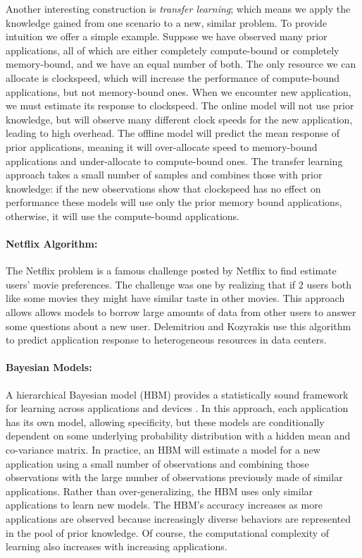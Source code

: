 Another interesting construction is \textit{transfer learning}; which
means we apply the knowledge gained from one scenario to a new,
similar problem.  To provide intuition we offer a simple example.
Suppose we have observed many prior applications, all of which are
either completely compute-bound or completely memory-bound, and we
have an equal number of both.  The only resource we can allocate is
clockspeed, which will increase the performance of compute-bound
applications, but not memory-bound ones.  When we encounter new
application, we must estimate its response to clockspeed.  The online
model will not use prior knowledge, but will observe many different
clock speeds for the new application, leading to high overhead.  The
offline model will predict the mean response of prior applications,
meaning it will over-allocate speed to memory-bound applications and
under-allocate to compute-bound ones.  The transfer learning approach
takes a small number of samples and combines those with prior
knowledge: if the new observations show that clockspeed has no effect
on performance these models will use only the prior memory bound
applications, otherwise, it will use the compute-bound applications.

\paragraph{Netflix Algorithm:}
The Netflix problem is a famous challenge posted by Netflix to find
estimate users' movie preferences. The challenge was one by realizing
that if 2 users both like some movies they might have similar taste in
other movies. This approach allows allows models to borrow large
amounts of data from other users to answer some questions about a new
user.  
Delemitriou and Kozyrakis use this algorithm to predict application
response to heterogeneous resources in data centers\cite{Paragon}.


\paragraph{ Bayesian Models:} A hierarchical Bayesian model (HBM)
provides a statistically sound framework for learning across
applications and devices \cite{LEO}.  In this approach, each
application has its own model, allowing specificity, but these models
are conditionally dependent on some underlying probability
distribution with a hidden mean and co-variance matrix.  In practice,
an HBM will estimate a model for a new application using a small
number of observations and combining those observations with the large
number of observations previously made of similar applications.
Rather than over-generalizing, the HBM uses only similar applications
to learn new models.  The HBM's accuracy increases as more
applications are observed because increasingly diverse behaviors are
represented in the pool of prior knowledge.  Of course, the
computational complexity of learning also increases with increasing
applications. 


